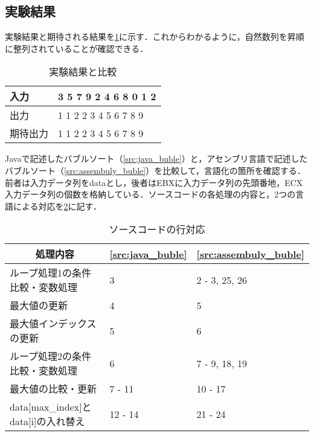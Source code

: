 \subsection{実験結果}
実験結果と期待される結果を\ref{tbl:execute}に示す．これからわかるように，自然数列を昇順に整列されていることが確認できる．\par
\begin{table}[H]
    \centering
    \caption{実験結果と比較}
    \label{tbl:execute}
    \begin{tabular}{l|l}
        入力   & {\ttfamily 1 3 5 7 9 2 4 6 8 0 1 2} \\
        \hline
        出力   & {\ttfamily 0 1 1 2 2 3 4 5 6 7 8 9} \\
        期待出力 & {\ttfamily 0 1 1 2 2 3 4 5 6 7 8 9}
    \end{tabular}
\end{table}
{\ttfamily Java}で記述したバブルソート（\ref{src:java_buble}）と，アセンブリ言語で記述したバブルソート（\ref{src:assembuly_buble}）を比較して，言語化の箇所を確認する．前者は入力データ列を{\ttfamily data}とし，後者は{\ttfamily EBX}に入力データ列の先頭番地，{\ttfamily ECX}入力データ列の個数を格納している．ソースコードの各処理の内容と，2つの言語による対応を\ref{tbl:ソースコードの行対応}に記す．
\begin{table}[htbp]
    \centering
    \caption{ソースコードの行対応}
    \label{tbl:ソースコードの行対応}
    \begin{tabular}{p{10cm}p{2cm}p{2cm}}
        \multicolumn{1}{c}{処理内容}                              & \multicolumn{1}{c}{\ref{src:java_buble}} & \multicolumn{1}{c}{\ref{src:assembuly_buble}} \\
        \hline
        ループ処理1の条件比較・変数処理                                      & 3                                        & 2 - 3, 25, 26                                 \\
        最大値の更新                                                & 4                                        & 5                                             \\
        最大値インデックスの更新                                          & 5                                        & 6                                             \\
        ループ処理2の条件比較・変数処理                                      & 6                                        & 7 - 9, 18, 19                                 \\
        最大値の比較・更新                                             & 7 - 11                                   & 10 - 17                                       \\
        {\ttfamily data[max\_index]}と{\ttfamily data[i]}の入れ替え & 12 - 14                                  & 21 - 24                                       \\
        \hline
    \end{tabular}
\end{table}\\
